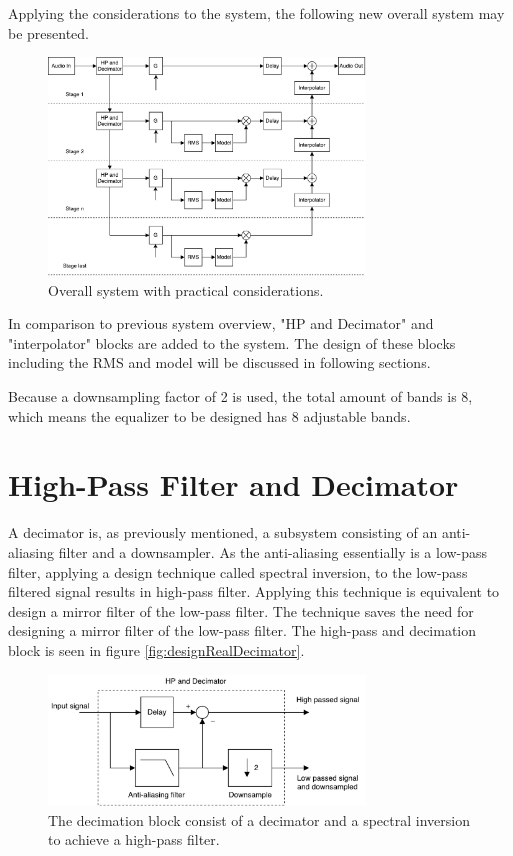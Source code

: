 Applying the considerations to the system, the following new overall system may be presented.

\begin{figure}[H]
\centering
\includegraphics[width=0.75\textwidth]{figures/designRealBlock1.pdf}
\caption{Overall system with practical considerations.}
\label{fig:designRealBlock}
\end{figure}

In comparison to previous system overview, "HP and Decimator" and "interpolator" blocks are added to the system. The design of these blocks including the RMS and model will be discussed in following sections. 

Because a downsampling factor of 2 is used, the total amount of bands is 8, which means the equalizer to be designed has 8 adjustable bands.


\section{High-Pass Filter and Decimator}

A decimator is, as previously mentioned, a subsystem consisting of an anti-aliasing filter and a downsampler. As the anti-aliasing essentially is a low-pass filter, applying a design technique called spectral inversion, to the low-pass filtered signal results in high-pass filter. Applying this technique is equivalent to design a mirror filter of the low-pass filter. The technique saves the need for designing a mirror filter of the low-pass filter. The high-pass and decimation block is seen in figure \autoref{fig:designRealDecimator}.

\begin{figure}[H]
\centering
\includegraphics[width=0.75\textwidth]{figures/designRealDecimator.pdf}
\caption{The decimation block consist of a decimator and a spectral inversion to achieve a high-pass filter.}
\label{fig:designRealDecimator}
\end{figure}


